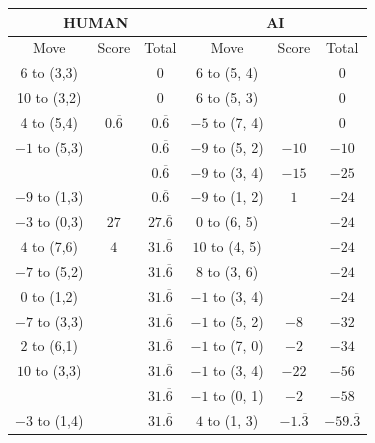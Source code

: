 \begin{appendices}
\begin{table}[H]
    \centering
    \begin{tabular}{cccccc}
        \hline
        \multicolumn{3}{c}{HUMAN}        & \multicolumn{3}{c}{AI}     \\ \hline
        Move         & Score & Total & Move          & Score & Total \\ \hline
          6 to (3,3) &       &  0    &   6 to (5, 4) &       &  0    \\ \hline
          10 to (3,2) &       &  0    &   6 to (5, 3) &       &  0    \\ \hline
          4 to (5,4) & $0.\overline6$ &  $0.\overline6$    &   $-5$ to (7, 4) &       &  0    \\ \hline
          $-1$ to (5,3) &             &  $0.\overline6$    &   $-9$ to (5, 2) & $-10$       &  $-10$    \\ \hline
                        &             &  $0.\overline6$    &   $-9$ to (3, 4) & $-15$       &  $-25$    \\ \hline
          $-9$ to (1,3) &             &  $0.\overline6$    &   $-9$ to (1, 2) & $1$       &  $-24$    \\ \hline
          $-3$ to (0,3) & $27$        &  $27.\overline6$    &   $0$ to (6, 5) &           &  $-24$    \\ \hline
          $4$ to (7,6)  & $4$        &  $31.\overline6$     &   $10$ to (4, 5) &           &  $-24$    \\ \hline
          $-7$ to (5,2)  &          &  $31.\overline6$     &   $8$ to (3, 6) &           &  $-24$    \\ \hline
          $0$ to (1,2)  &           &  $31.\overline6$     &   $-1$ to (3, 4) &           &  $-24$    \\ \hline
          $-7$ to (3,3)  &           &  $31.\overline6$     &   $-1$ to (5, 2) & $-8$           &  $-32$    \\ \hline
          $2$ to (6,1)  &           &  $31.\overline6$     &   $-1$ to (7, 0) & $-2$           &  $-34$    \\ \hline
          $10$ to (3,3)  &          &  $31.\overline6$     &   $-1$ to (3, 4) & $-22$           &  $-56$    \\ \hline
                         &          &  $31.\overline6$     &   $-1$ to (0, 1) & $-2$           &  $-58$    \\ \hline
          $-3$ to (1,4)  &          &  $31.\overline6$     &   $4$ to (1, 3) & $-1.\overline3$    &  $-59.\overline3$    \\ \hline

\end{tabular}
\end{table}
\end{appendices}
